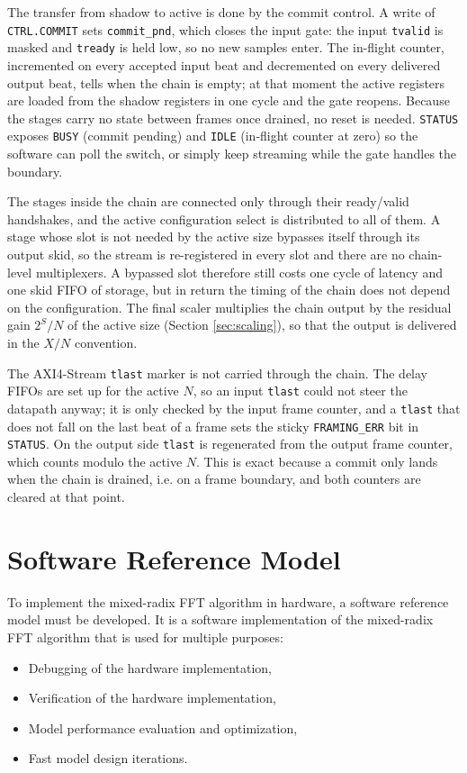 \documentclass[a4paper,12pt, master]{etf}
\begin{document}
The transfer from shadow to active is done by the commit control. A write of \texttt{CTRL.COMMIT} sets \texttt{commit\_pnd}, which closes the input gate: the input \texttt{tvalid} is masked and \texttt{tready} is held low, so no new samples enter. The in-flight counter, incremented on every accepted input beat and decremented on every delivered output beat, tells when the chain is empty; at that moment the active registers are loaded from the shadow registers in one cycle and the gate reopens. Because the stages carry no state between frames once drained, no reset is needed. \texttt{STATUS} exposes \texttt{BUSY} (commit pending) and \texttt{IDLE} (in-flight counter at zero) so the software can poll the switch, or simply keep streaming while the gate handles the boundary.

The stages inside the chain are connected only through their ready/valid handshakes, and the active configuration select is distributed to all of them. A stage whose slot is not needed by the active size bypasses itself through its output skid, so the stream is re-registered in every slot and there are no chain-level multiplexers. A bypassed slot therefore still costs one cycle of latency and one skid FIFO of storage, but in return the timing of the chain does not depend on the configuration. The final scaler multiplies the chain output by the residual gain $2^{S}/N$ of the active size (Section \ref{sec:scaling}), so that the output is delivered in the $X/N$ convention.

The AXI4-Stream \texttt{tlast} marker is not carried through the chain. The delay FIFOs are set up for the active $N$, so an input \texttt{tlast} could not steer the datapath anyway; it is only checked by the input frame counter, and a \texttt{tlast} that does not fall on the last beat of a frame sets the sticky \texttt{FRAMING\_ERR} bit in \texttt{STATUS}. On the output side \texttt{tlast} is regenerated from the output frame counter, which counts modulo the active $N$. This is exact because a commit only lands when the chain is drained, i.e. on a frame boundary, and both counters are cleared at that point.

\chapter{Software Reference Model}
\label{ch:software_model}
To implement the mixed-radix FFT algorithm in hardware, a software reference model must be developed. It is a software implementation of the mixed-radix FFT algorithm that is used for multiple purposes:
\begin{itemize}
    \item Debugging of the hardware implementation,
    \item Verification of the hardware implementation,
    \item Model performance evaluation and optimization,
    \item Fast model design iterations.
\end{itemize}
\end{document}
